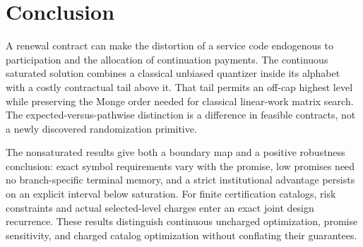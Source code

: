 \section{Conclusion}
A renewal contract can make the distortion of a service code endogenous to participation and the allocation of continuation payments. The continuous saturated solution combines a classical unbiased quantizer inside its alphabet with a costly contractual tail above it. That tail permits an off-cap highest level while preserving the Monge order needed for classical linear-work matrix search. The expected-versus-pathwise distinction is a difference in feasible contracts, not a newly discovered randomization primitive.

The nonsaturated results give both a boundary map and a positive robustness conclusion: exact symbol requirements vary with the promise, low promises need no branch-specific terminal memory, and a strict institutional advantage persists on an explicit interval below saturation. For finite certification catalogs, risk constraints and actual selected-level charges enter an exact joint design recurrence. These results distinguish continuous uncharged optimization, promise sensitivity, and charged catalog optimization without conflating their guarantees.
